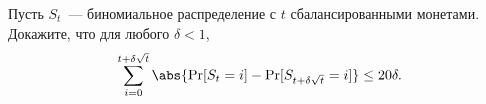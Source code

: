 Пусть $S_t$~--- биномиальное распределение с $t$ сбалансированными монетами. Докажите, что для любого
$\delta < 1$,
$$
    \sum\limits_{i = 0}^{t + \delta \sqrt{t}} \abs{\Pr[S_t = i] - \Pr[S_{t + \delta \sqrt{t}} = i]} \le 20
    \delta.
$$